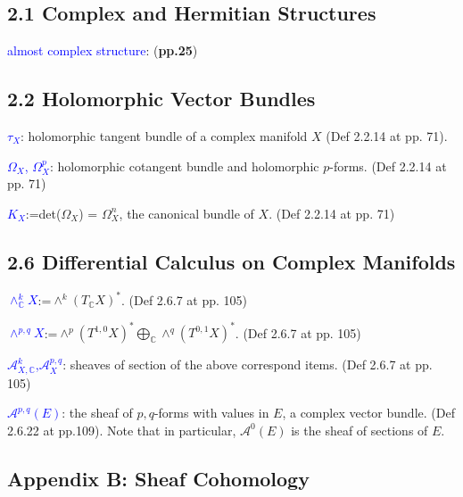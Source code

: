 \documentclass{book}
\numberwithin{equation}{subsection} %
\theoremstyle{definition}
\begin{document}
    \subsection{2.1 Complex and Hermitian Structures}
    \textcolor{blue}{almost complex structure}: (\textbf{pp.25})
	\subsection{2.2 Holomorphic Vector Bundles}

    \textcolor{blue}{$\tau_X$}: holomorphic tangent bundle of a complex manifold $X$ (Def 2.2.14 at pp. 71).
    
    \textcolor{blue}{$\varOmega_X$, $\varOmega^p_X$}: holomorphic cotangent bundle and holomorphic $p$-forms. (Def 2.2.14 at pp. 71)
    
    \textcolor{blue}{$K_X$}:=det($\varOmega_X$) = $\varOmega_X^n$, the canonical bundle of $X$. (Def 2.2.14 at pp. 71)

    \subsection{2.6 Differential Calculus on Complex Manifolds}

    \textcolor{blue}{$\wedge^k_{\mathbb{C}}X$}:=$\wedge^k(T_{\mathbb{C}}X)^*$. (Def 2.6.7 at pp. 105)
    
    \textcolor{blue}{$\wedge^{p,q}X$}:=$\wedge^p(T^{1,0}X)^*
                        \bigoplus_{\mathbb{C}}\wedge^q(T^{0,1}X)^*$. (Def 2.6.7 at pp. 105)

    \textcolor{blue}{$\mathcal{A}^k_{X,\mathbb{C}}$,$\mathcal{A}^{p,q}_X$}: sheaves of section of the above correspond items. (Def 2.6.7 at pp. 105)
    
    \textcolor{blue}{$\mathcal{A}^{p,q}(E)$}: the sheaf of $p,q$-forms with values in $E$, a complex vector bundle. (Def 2.6.22 at pp.109). Note that in particular, $\mathcal{A}^0(E)$ is the sheaf of sections of $E$.

	\subsection{Appendix B: Sheaf Cohomology}
	
\end{document}
